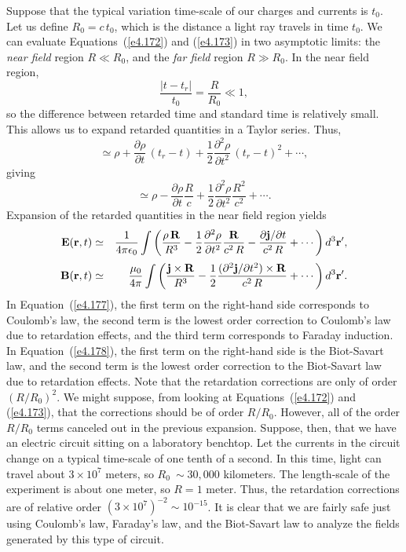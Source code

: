 Suppose that the typical variation time-scale of our charges and currents is $t_0$. Let
us define $R_0 = c\, t_0$, which is the distance a light ray travels in time $t_0$. We
can evaluate Equations~(\ref{e4.172}) and (\ref{e4.173}) in two asymptotic limits: the {\em near field}
region $R\ll R_0$, and the {\em far field} region $R\gg R_0$. In the near field region,
\begin{equation}
\frac{|t -t_r|}{t_0} = \frac{R}{R_0} \ll 1,
\end{equation}
so the difference between retarded time and standard time is relatively small.  This
allows us to expand retarded quantities in a Taylor series. Thus,
\begin{equation}
[\rho] \simeq \rho + \frac{\partial\rho}{\partial t} \,(t_r-t)
+ \frac{1}{2} \frac{\partial^2 \rho}{\partial t^2}\,(t_r -t )^2+\cdots,
\end{equation}
giving 
\begin{equation}
[\rho] \simeq \rho - \frac{\partial \rho}{\partial t} \frac{R}{c} + \frac{1}{2} 
\frac{\partial^2 \rho}{\partial t^2} \frac{R^2}{c^2} + \cdots.
\end{equation}
Expansion of the retarded quantities in the near field region yields
\begin{eqnarray}\label{e4.177}
{\bf E}({\bf r},t) &\simeq &\frac{1}{4\pi \epsilon_0} \int \left(
\frac{\rho\,{\bf R}}{R^3} - \frac{1}{2} \frac{\partial^2\rho}{\partial t^2}
\frac{\bf R}{c^2\, R} - \frac{\partial {\bf j}/\partial t}{c^2 \,R}+\cdots\right)d^3{\bf r}',\\[0.5ex]
{\bf B} ({\bf r},t)&\simeq& \frac{\mu_0}{4\pi} \int \left(\frac{{\bf j}\times{\bf R}}{R^3} - \frac{1}{2}
\frac{(\partial^2 {\bf j}/ \partial t^2)\times{\bf R}}{c^2\, R} +\cdots \right)
d^3{\bf r}'.\label{e4.178}
\end{eqnarray}
In Equation~(\ref{e4.177}), the first term on the right-hand side corresponds to Coulomb's law, the second
term is the lowest order correction to Coulomb's law due to retardation effects, and the third term corresponds to Faraday
induction. In Equation~(\ref{e4.178}), the first term on the right-hand side is the Biot-Savart law,
and the second term is the lowest order correction to the Biot-Savart law due to retardation effects. Note that the retardation
corrections are only of order $(R/R_0)^2$. We might suppose, from looking at Equations~(\ref{e4.172}) and
(\ref{e4.173}), that the corrections should be of order $R/R_0$.  However, all of the order $R/R_0$
terms canceled out in the previous  expansion. Suppose, then, that we have an electric circuit
sitting on a laboratory benchtop. Let the currents in the circuit change on a
typical  time-scale of
one tenth of a second. In this time, light can travel about $3\times 10^7$ meters, so
$R_0\ \sim 30,000$ kilometers. The length-scale of the experiment is about one meter, so
$R = 1$ meter. Thus, the retardation corrections are of relative order $(3\times 10^7)^{-2}
\sim 10^{-15}$. It is clear that we are fairly safe just using Coulomb's law, Faraday's law,
and the Biot-Savart law to analyze the fields generated by  this type of circuit. 

